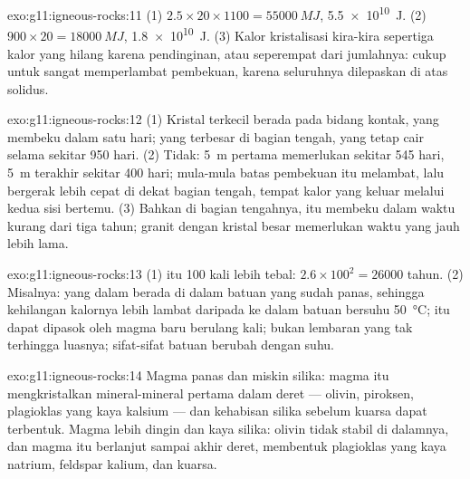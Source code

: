 \begin{solution}{exo:g11:igneous-rocks:11}
(1) $2.5 \times 20 \times 1100 = \qty{55000}{MJ}$, \qty{5.5e10}{J}.
(2) $900 \times 20 = \qty{18000}{MJ}$, \qty{1.8e10}{J}. (3) Kalor
kristalisasi kira-kira sepertiga kalor yang hilang karena pendinginan, atau
seperempat dari jumlahnya: cukup untuk sangat memperlambat pembekuan, karena
seluruhnya dilepaskan di atas solidus.
\end{solution}

\begin{solution}{exo:g11:igneous-rocks:12}
(1) Kristal terkecil berada pada bidang kontak, yang membeku dalam satu hari;
yang terbesar di bagian tengah, yang tetap cair selama sekitar 950 hari.
(2) Tidak: \qty{5}{m} pertama memerlukan sekitar 545 hari, \qty{5}{m} terakhir
sekitar 400 hari; mula-mula batas pembekuan itu melambat, lalu bergerak lebih
cepat di dekat bagian tengah, tempat kalor yang keluar melalui kedua sisi
bertemu. (3) Bahkan di bagian tengahnya,  itu membeku dalam waktu kurang
dari tiga tahun; granit dengan kristal besar memerlukan waktu yang jauh lebih
lama.
\end{solution}

\begin{solution}{exo:g11:igneous-rocks:13}
(1)  itu 100 kali lebih tebal: $2.6 \times 100^2 = \num{26000}$
tahun. (2) Misalnya:  yang dalam berada di dalam batuan yang sudah panas,
sehingga kehilangan kalornya lebih lambat daripada ke dalam batuan bersuhu
\qty{50}{\degreeCelsius};  itu dapat dipasok oleh magma baru berulang
kali;  bukan lembaran yang tak terhingga luasnya; sifat-sifat batuan
berubah dengan suhu.
\end{solution}

\begin{solution}{exo:g11:igneous-rocks:14}
Magma  panas dan miskin silika: magma itu mengkristalkan mineral-mineral
pertama dalam deret --- olivin, piroksen, plagioklas yang kaya kalsium --- dan
kehabisan silika sebelum kuarsa dapat terbentuk. Magma  lebih dingin dan
kaya silika: olivin tidak stabil di dalamnya, dan magma itu berlanjut sampai
akhir deret, membentuk plagioklas yang kaya natrium, feldspar kalium, dan
kuarsa.
\end{solution}

